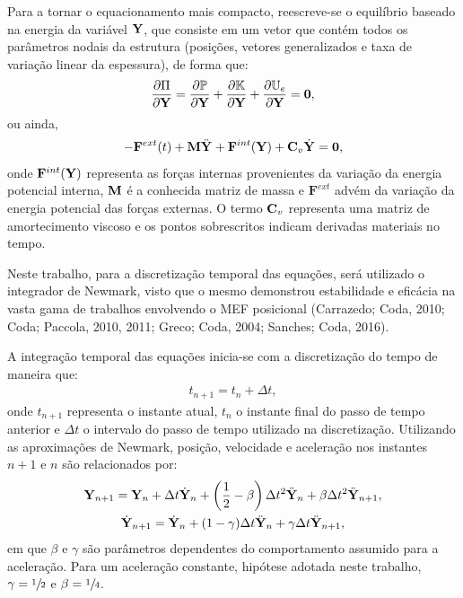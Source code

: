 Para a tornar o equacionamento mais compacto, reescreve-se o equilíbrio baseado na energia da variável $\mathbf{Y}$, que consiste em um vetor que contém todos os parâmetros nodais da estrutura (posições, vetores generalizados e taxa de variação linear da espessura), de forma que:
\begin{align}
	\frac{\partial\Pi}{\partial\mathbf{Y}} = \frac{\partial\mathbb{P}}{\partial \mathbf{Y}} + \frac{\partial\mathbb{K}}{\partial \mathbf{Y}} + \frac{\partial\mathbb{U}_e}{\partial \mathbf{Y}} = \mathbf{0},
\end{align}
\noindent ou ainda,
\begin{align}
	- \mathbf{F}^{ext}(t) + \mathbf{M}\ddot{\mathbf{Y}}_{}+ \mathbf{F}^{int}(\mathbf{Y}) + \mathbf{C}_v\dot{\mathbf{Y}}_{} = \mathbf{0}, \label{eq:equi_forma_matricial}
\end{align}
\noindent onde $ \mathbf{F}^{int}(\mathbf{Y})$ representa as forças internas provenientes da variação da energia potencial interna, $\mathbf{M}$ é a conhecida matriz de massa e $\mathbf{F}^{ext}$ advém da variação da energia potencial das forças externas. O termo $\mathbf{C}_v$ representa uma matriz de amortecimento viscoso e os pontos sobrescritos indicam derivadas materiais no tempo.

Neste trabalho, para a discretização temporal das equações, será utilizado o integrador de Newmark, visto que o mesmo demonstrou estabilidade e eficácia na vasta gama de trabalhos envolvendo o MEF posicional (Carrazedo; Coda, 2010;
Coda; Paccola, 2010, 2011; Greco; Coda, 2004; Sanches; Coda, 2016).

A integração temporal das equações inicia-se com a discretização do tempo de maneira que:
\begin{align}
	t_{n+1} = t_{n} + \Delta t, \label{eq:disc_tempo}
\end{align}
\noindent onde $t_{n+1}$ representa o instante atual, $t_{n}$ o instante final do passo de tempo anterior e  $\Delta t$ o intervalo do passo de tempo utilizado na discretização. Utilizando as aproximações de Newmark, posição, velocidade e aceleração nos instantes $n+1$ e $n$ são relacionados por:
\begin{gather}
	\mathbf{Y}_{n+1}=\mathbf{Y}_{n} + \Delta t \dot{\mathbf{Y}}_{n}+\left(\frac{1}{2}-\beta\right) \Delta t^2 \ddot{\mathbf{Y}}_{n}+ \beta \Delta t^2 \ddot{\mathbf{Y}}_{n+1},\label{eq:newmark1}\\
	\dot{\mathbf{Y}}_{n+1} = \dot{\mathbf{Y}}_{n}+(1-\gamma)\Delta t \ddot{\mathbf{Y}}_{n}+\gamma \Delta t \ddot{\mathbf{Y}}_{n+1},\label{eq:newmark2}
\end{gather}
\noindent em que $\beta$ e $\gamma$ são parâmetros dependentes do comportamento assumido para a aceleração. Para um aceleração constante, hipótese adotada neste trabalho, $\gamma=\sfrac{1}{2}$ e $\beta=\sfrac{1}{4}$.

